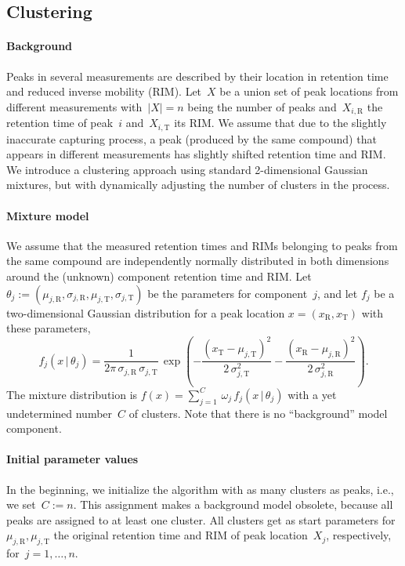 \documentclass{article}
\newcommand{\given}{\,|\,}
\begin{document}
\subsection{Clustering}
\label{sec:clustering}

\paragraph*{Background}
Peaks in several measurements are described by their location in retention time and reduced inverse mobility (RIM).
Let~$X$ be a union set of peak locations from different measurements with~$|X| = n$ being the number of peaks and~$X_{i,\text{R}}$ the retention time of peak~$i$ and~$X_{i,\text{T}}$ its RIM.
We assume that due to the slightly inaccurate capturing process, a peak (produced by the same compound) that appears in different measurements has slightly shifted retention time and RIM.
We introduce a clustering approach using standard 2-dimensional Gaussian mixtures, but with dynamically adjusting the number of clusters in the process.

\paragraph{Mixture model}
We assume that the measured retention times and RIMs belonging to peaks from the same compound are independently normally distributed in both dimensions around the (unknown) component retention time and RIM.
Let $\theta_j := (\mu_{j,\text{R}}, \sigma_{j,\text{R}}, \mu_{j,\text{T}}, \sigma_{j,\text{T}})$ be the parameters for component~$j$, and let $f_j$ be a two-dimensional Gaussian distribution for a peak location $x=(x_\text{R}, x_\text{T})$ with these parameters,
\[ f_j(x \given \theta_j) 
   = \frac{1}{2 \pi \, \sigma_{j,\text{R}} \, \sigma_{j,\text{T}}}
   \, \exp \left( 
   -\frac{(x_{\text{T}} - \mu_{j,\text{T}})^2}{2\,\sigma_{j,\text{T}}^2}
   -\frac{(x_{\text{R}} - \mu_{j,\text{R}})^2}{2\,\sigma_{j,\text{R}}^2}
   \right).
\]
The mixture distribution is $f(x) = \sum_{j=1}^C\, \omega_j\, f_j(x\given \theta_j)$ with a yet undetermined number~$C$ of clusters.
Note that there is no ``background'' model component.

\paragraph*{Initial parameter values}
In the beginning, we initialize the algorithm with as many clusters as peaks, i.e., we set~$C:=n$.
This assignment makes a background model obsolete, because all peaks are assigned to at least one cluster.
All clusters get as start parameters for $\mu_{j,\text{R}}, \mu_{j,\text{T}}$ the original retention time and  RIM of peak location~$X_j$, respectively, for~$j = 1,\dots,n$.
\end{document}
